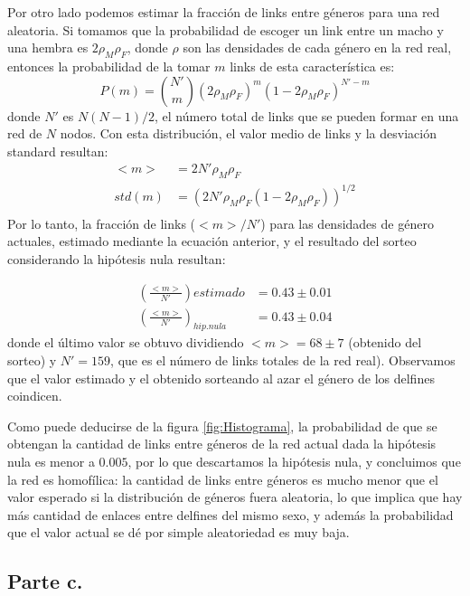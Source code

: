\par Por otro lado podemos estimar la fracción de links entre géneros para una red aleatoria. Si tomamos que la probabilidad de escoger un link entre un macho y una hembra es $2 \rho_{M} \rho_{F}$, donde $\rho$ son las densidades de cada género en la red real, entonces la probabilidad de la tomar $m$ links de esta característica es:
\begin{equation}
	P(m) = {N' \choose m} (2 \rho_{M} \rho_{F})^{m} (1 - 2 \rho_{M} \rho_{F})^{N' - m}
\end{equation}
donde $N'$ es $N(N-1)/2$, el número total de links que se pueden formar en una red de $N$ nodos. Con esta distribución, el valor medio de links y la desviación standard resultan:
\begin{align*}
	<m> & = 2 N' \rho_{M} \rho_{F} \\
	std(m) & = (2 N' \rho_{M} \rho_{F} (1 - 2 \rho_{M} \rho_{F}))^{1/2}\\
\end{align*}
Por lo tanto, la fracción de links ($<m>/N'$) para las densidades de género actuales, estimado mediante la ecuación anterior, y el resultado del sorteo considerando la hipótesis nula resultan:

\begin{align*}
	(\frac{<m>}{N'}){estimado} & = 0.43 \pm 0.01 \\
	(\frac{<m>}{N'})_{hip.nula} & = 0.43 \pm 0.04
\end{align*}
donde el último valor se obtuvo dividiendo $<m> = 68 \pm 7$ (obtenido del sorteo) y $N' = 159$, que es el número de links totales de la red real). Observamos que el valor estimado y el obtenido sorteando al azar el género de los delfines coindicen.
\par Como puede deducirse de la figura \ref{fig:Histograma}, la probabilidad de que se obtengan la cantidad de links entre géneros de la red actual dada la hipótesis nula es menor a $0.005$, por lo que descartamos la hipótesis nula, y concluimos que la red es homofílica: la cantidad de links entre géneros es mucho menor que el valor esperado si la distribución de géneros fuera aleatoria, lo que implica que hay más cantidad de enlaces entre delfines del mismo sexo, y además la probabilidad que el valor actual se dé por simple aleatoriedad es muy baja.

\subsection{Parte c.}

